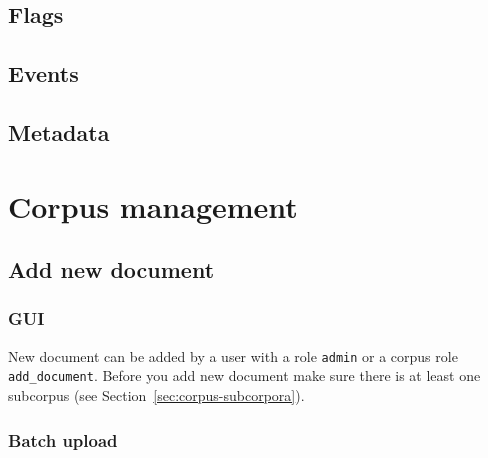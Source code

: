 \documentclass[a4paper,10pt,oneside]{scrbook}
\begin{document}
\section{Flags}

\section{Events}

\section{Metadata}


\chapter{Corpus management}
\section{Add new document}

\subsection{GUI}

New document can be added by a user with a role \verb|admin| or a corpus role \verb|add_document|. Before you add new document make sure there is at least one subcorpus (see Section~\ref{sec:corpus-subcorpora}).

\subsection{Batch upload}
\end{document}
